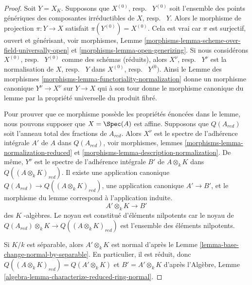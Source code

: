\begin{proof}
Soit $Y = X_K$. Supposons que $X^{(0)}$, resp. \ $Y^{(0)}$ soit
l'ensemble des points génériques des composantes irréductibles
de $X$, resp. \ $Y$. Alors le morphisme de projection $\pi : Y
\to X$ satisfait $\pi(Y^{(0)}) = X^{(0)}$. Cela est vrai car
$\pi$ est surjectif, ouvert et générisant, voir morphismes, Lemme
\ref{morphisms-lemma-scheme-over-field-universally-open} et
\ref{morphisms-lemma-open-generizing}. Si nous considérons
$X^{(0)}$, resp. \ $Y^{(0)}$ comme des schémas (réduits), alors
$X^\nu$, resp. \ $Y^\nu$ est la normalisation de $X$, resp. \ $Y$
dans $X^{(0)}$, resp. \ $Y^{(0})$. Ainsi le Lemme des morphismes
\ref{morphisms-lemma-functoriality-normalization} donne un morphisme
canonique $Y^\nu \to X^\nu$ sur $Y \to X$ qui à son tour donne le
morphisme canonique du lemme par la propriété universelle du produit fibré.

\medskip\noindent
Pour prouver que ce morphisme possède les propriétés énoncées dans le
lemme, nous pouvons supposer que $X = \Spec(A)$ est affine. Supposons
que $Q(A_{red})$ soit l'anneau total des fractions de $A_{red}$. Alors
$X^\nu$ est le spectre de l'adhérence intégrale $A'$ de $A$ dans
$Q(A_{red})$, voir morphismes, lemmes
\ref{morphisms-lemma-normalization-reduced} et
\ref{morphisms-lemma-description-normalization}. De même, $Y^\nu$ est le spectre de
l'adhérence intégrale $B'$ de $A \otimes_k K$ dans $Q((A \otimes_k K)_{red})$. Il
existe une application canonique $Q(A_{red}) \to Q((A \otimes_k K)_{red})$, une
application canonique $A' \to B'$, et le morphisme du lemme correspond à l'application induite.
$$
A' \otimes_k K \longrightarrow B'
$$
des $K$ -algèbres. Le noyau est constitué d'éléments
nilpotents car le noyau de $Q(A_{red}) \otimes_k K \to Q((A
\otimes_k K)_{red})$ est l'ensemble des éléments nilpotents.

\medskip\noindent
Si $K/k$ est séparable, alors $A' \otimes_k K$ est normal
d'après le Lemme \ref{lemma-base-change-normal-by-separable}.
En particulier, il est réduit, donc $Q((A \otimes_k K)_{red})
= Q(A' \otimes_k K)$ et $B' = A' \otimes_k K$ d'après
l'Algèbre, Lemme \ref{algebra-lemma-characterize-reduced-ring-normal}.


\end{proof}
